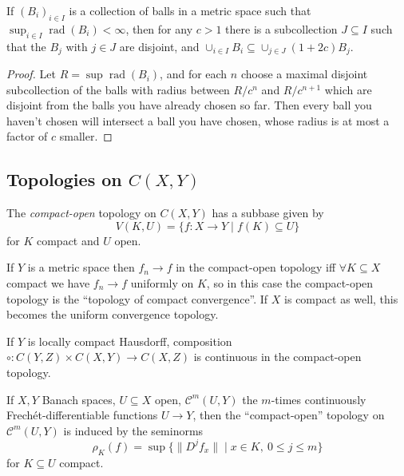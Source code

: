 \documentclass[letterpaper,11pt]{report}
\DeclareMathOperator{\rad}{rad}
\begin{document}
\begin{lem} If $(B_i)_{i\in I}$ is a collection of balls in a metric space such that $\sup_{i\in I} \rad(B_i) < \infty$, then for any $c > 1$ there is a subcollection $J \subseteq I$ such that the $B_j$ with $j \in J$ are disjoint, and $\cup_{i\in I} B_i \subseteq \cup_{j\in J} (1+2c)B_j$.
\end{lem}
\begin{proof} Let $R = \sup \rad(B_i)$, and for each $n$ choose a maximal disjoint subcollection of the balls with radius between $R/c^n$ and $R/c^{n+1}$ which are disjoint from the balls you have already chosen so far. Then every ball you haven't chosen will intersect a ball you have chosen, whose radius is at most a factor of $c$ smaller.
\end{proof}


\subsection{Topologies on $C(X,Y)$}

\begin{defn} The \emph{compact-open} topology on $C(X,Y)$ has a subbase given by
\[
V(K,U) = \{f:X\rightarrow Y \mid f(K) \subseteq U\}
\]
for $K$ compact and $U$ open.
\end{defn}

\begin{prop} If $Y$ is a metric space then $f_n \rightarrow f$ in the compact-open topology iff $\forall K \subseteq X$ compact we have $f_n \rightarrow f$ uniformly on $K$, so in this case the compact-open topology is the ``topology of compact convergence''. If $X$ is compact as well, this becomes the uniform convergence topology.
\end{prop}

\begin{prop} If $Y$ is locally compact Hausdorff, composition $\circ : C(Y,Z) \times C(X,Y) \rightarrow C(X,Z)$ is continuous in the compact-open topology.
\end{prop}

\begin{defn} If $X,Y$ Banach spaces, $U\subseteq X$ open, $\mathcal{C}^m(U,Y)$ the $m$-times continuously Frech\'et-differentiable functions $U \rightarrow Y$, then the ``compact-open'' topology on $\mathcal{C}^m(U,Y)$ is induced by the seminorms
\[
\rho_K(f) = \sup\{\|D^jf_x\| \mid x \in K,\ 0 \le j \le m\}
\]
for $K \subseteq U$ compact.
\end{defn}
\end{document}
